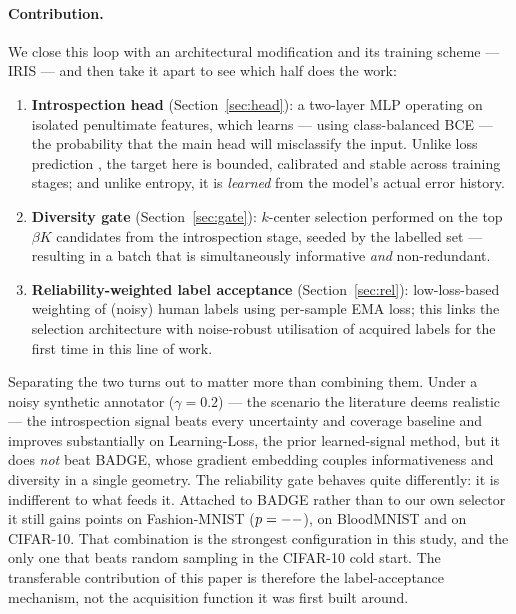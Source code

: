 \documentclass[a4paper,fleqn,longmktitle]{cas-sc}
\newcommand{\method}{IRIS}
\begin{document}
\paragraph{Contribution.} We close this loop with an architectural
modification and its training scheme --- \method{} --- and then take it
apart to see which half does the work:
\begin{enumerate}
\item \textbf{Introspection head} (Section~\ref{sec:head}): a two-layer
MLP operating on isolated penultimate features, which learns --- using
class-balanced BCE --- the probability that the main head will
misclassify the input. Unlike loss prediction \citep{yoo2019}, the
target here is bounded, calibrated and stable across training stages;
and unlike entropy, it is \emph{learned} from the model's actual error
history.
\item \textbf{Diversity gate} (Section~\ref{sec:gate}): $k$-center
selection performed on the top $\beta K$ candidates from the
introspection stage, seeded by the labelled set --- resulting in a
batch that is simultaneously informative \emph{and} non-redundant.
\item \textbf{Reliability-weighted label acceptance}
(Section~\ref{sec:rel}): low-loss-based weighting of (noisy) human
labels using per-sample EMA loss; this links the selection architecture
with noise-robust utilisation of acquired labels for the first time in
this line of work.
\end{enumerate}
Separating the two turns out to matter more than combining them. Under
a noisy synthetic annotator ($\gamma=0.2$) --- the scenario the
literature deems realistic --- the introspection signal beats every
uncertainty and coverage baseline and improves substantially on
Learning-Loss, the prior learned-signal method, but it does \emph{not}
beat BADGE, whose gradient embedding couples informativeness and
diversity in a single geometry. The reliability gate behaves quite
differently: it is indifferent to what feeds it. Attached to BADGE
rather than to our own selector it still gains
\FmnistRelOnBadgeGain{} points on Fashion-MNIST
($p=--$), \BloodRelOnBadgeGain{} on BloodMNIST and
\CifarRelOnBadgeGain{} on CIFAR-10. That combination is the strongest
configuration in this study, and the only one that beats random
sampling in the CIFAR-10 cold start. The transferable contribution of
this paper is therefore the label-acceptance mechanism, not the
acquisition function it was first built around.
\end{document}
